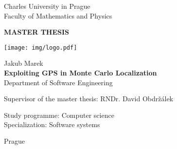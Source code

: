 \begin{titlingpage}
\begin{center}

\vspace{15mm}

\large
Charles University in Prague\\
Faculty of Mathematics and Physics\\

\vspace{10mm}

{\Large\textbf{MASTER THESIS}}

\vspace{20mm}

\texttt{[image: img/logo.pdf]} 

\vspace{20mm}

{\Large Jakub Marek}\\
\vspace{5mm}
{\Large\textbf{Exploiting GPS in Monte Carlo Localization}}\\
\vspace{5mm}
Department of Software Engineering\\
\vspace{20mm}

\large
\noindent Supervisor of the master thesis: RNDr. David Obdržálek
\vspace{1mm} 

\noindent Study programme: Computer science \\
Specialization: Software systems

\vspace{20mm}

Prague \the\year
\end{center}

\end{titlingpage}

\movetooddpage

